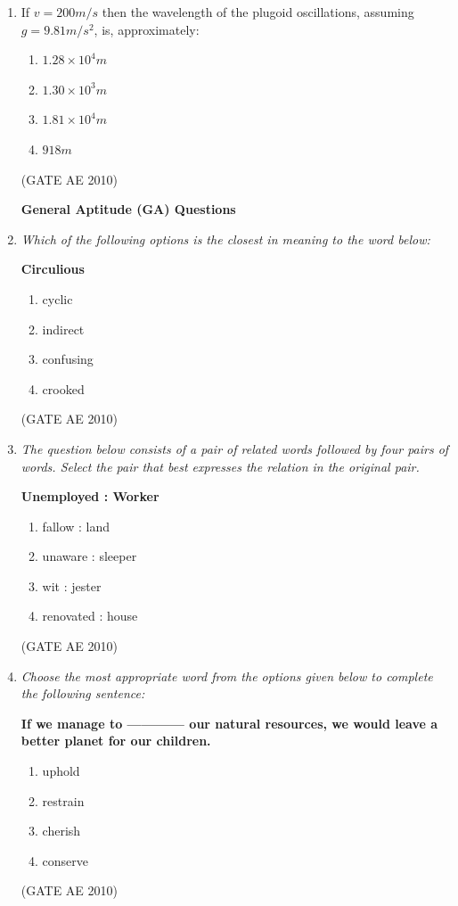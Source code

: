 \documentclass[journal]{IEEEtran}
\begin{document}
\begin{enumerate}
\item If $ v = 200  m/s $ then the wavelength of the plugoid oscillations, assuming $ g = 9.81  m/s^2 $, is, approximately:
\begin{multicols}{4}
\begin{enumerate}
\item $ 1.28 \times 10^4  m $
\item $ 1.30 \times 10^3  m $
\item $ 1.81 \times 10^4  m $
\item $ 918  m $
\end{enumerate}
\end{multicols}
\hfill (GATE AE 2010)

\textbf{General Aptitude (GA) Questions}

\item \textit{Which of the following options is the closest in meaning to the word below:}

\textbf{Circulious}

\begin{enumerate}
\item cyclic
\item indirect
\item confusing
\item crooked
\end{enumerate}
\hfill (GATE AE 2010)

\item \textit{The question below consists of a pair of related words followed by four pairs of words. Select the pair that best expresses the relation in the original pair.}

\textbf{Unemployed : Worker}

\begin{enumerate}
\item fallow : land
\item unaware : sleeper
\item wit : jester
\item renovated : house
\end{enumerate}
\hfill (GATE AE 2010)

\item \textit{Choose the most appropriate word from the options given below to complete the following sentence:}

\textbf{If we manage to ------------ our natural resources, we would leave a better planet for our children.}

\begin{enumerate}
\item uphold
\item restrain
\item cherish
\item conserve
\end{enumerate}
\hfill (GATE AE 2010)


\end{enumerate}
\end{document}
